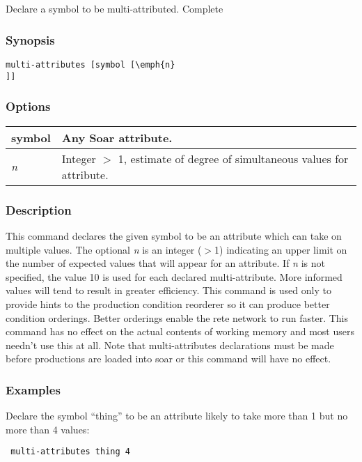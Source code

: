 \subsection{}
\label{multi-attributes}
Declare a symbol to be multi-attributed. 
 Complete
\subsubsection*{Synopsis}
\begin{verbatim}
multi-attributes [symbol [\emph{n}
]] 
\end{verbatim}
\subsubsection*{Options}
\begin{tabular}{|l|l|}
\hline 
symbol & Any Soar attribute.  \\
 \hline 
\emph{n}
 & Integer $>$ 1, estimate of degree of simultaneous values for attribute.  \\
 \hline 
\end{tabular}
\subsubsection*{Description}
 This command declares the given symbol to be an attribute which can take on multiple values. The optional \emph{n}
 is an integer ($>$1) indicating an upper limit on the number of expected values that will appear for an attribute. If \emph{n}
 is not specified, the value 10 is used for each declared multi-attribute. More informed values will tend to result in greater efficiency. This command is used only to provide hints to the production condition reorderer so it can produce better condition orderings. Better orderings enable the rete network to run faster. This command has no effect on the actual contents of working memory and most users needn't use this at all. 
 Note that multi-attributes declarations must be made before productions are loaded into soar or this command will have no effect. 
\subsubsection*{Examples}
 Declare the symbol ``thing'' to be an attribute likely to take more than 1 but no more than 4 values: \begin{verbatim}
 multi-attributes thing 4 
\end{verbatim}
